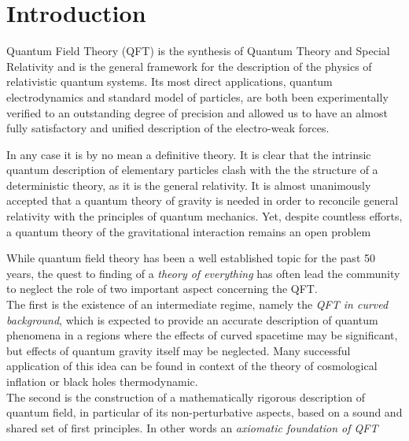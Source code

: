 \documentclass[Main]{subfiles}
\begin{document}
\chapter*{Introduction}


Quantum Field Theory (QFT)  is the synthesis of Quantum Theory and Special Relativity and is the general framework for the description of the physics of relativistic quantum systems.
Its most direct applications, quantum electrodynamics and standard model of particles, are both been experimentally verified to an outstanding degree of precision and allowed us to have an almost fully satisfactory and unified description of the electro-weak forces.

In any case it is by no mean a definitive theory. It is clear that the intrinsic quantum description of elementary particles clash with the the structure of a deterministic theory, as it is the general relativity. 
It is almost unanimously accepted that a quantum theory of gravity is needed in order to reconcile general relativity with the principles of quantum mechanics. Yet, despite countless efforts, a quantum theory of the gravitational interaction remains an open problem

While quantum field theory has been a well established topic for the past 50 years, the quest to finding of a \emph{theory of everything} has often lead the community to neglect the role of two important aspect concerning the QFT.\\
The first is the existence of an intermediate regime, namely the \emph{QFT in curved background}, which is expected to provide an accurate description of quantum phenomena in a regions where the effects of curved spacetime may be significant, but effects of quantum gravity itself may be neglected. 
Many successful application of this idea can be found in context of the theory of cosmological inflation or black holes thermodynamic.\\
The second is the construction of a mathematically rigorous description of quantum field, in particular of its non-perturbative aspects,  based on a sound and shared set of first principles. In other words an \emph{axiomatic foundation of QFT}
\end{document}
